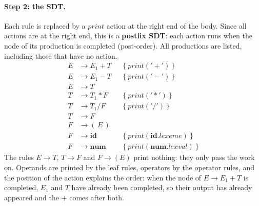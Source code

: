 \documentclass[11pt,a4paper]{article}
\newcommand{\at}[2]{\ensuremath{#1.\mathit{#2}}}
\newcommand{\tok}[1]{\ensuremath{\mathtt{#1}}}
\begin{document}
\paragraph{Step 2: the SDT.} Each rule is replaced by a $\mathit{print}$ action at the right end of the body. Since all actions are at the right end, this is a \textbf{postfix SDT}: each action runs when the node of its production is completed (post-order). All productions are listed, including those that have no action.
\begin{align*}
E &\to E_1 + T &&\{\ \mathit{print}(\tok{'+'})\ \}\\
E &\to E_1 - T &&\{\ \mathit{print}(\tok{'-'})\ \}\\
E &\to T\\
T &\to T_1 * F &&\{\ \mathit{print}(\tok{'*'})\ \}\\
T &\to T_1 / F &&\{\ \mathit{print}(\tok{'/'})\ \}\\
T &\to F\\
F &\to (\,E\,)\\
F &\to \mathbf{id}  &&\{\ \mathit{print}(\at{\mathbf{id}}{lexeme})\ \}\\
F &\to \mathbf{num} &&\{\ \mathit{print}(\at{\mathbf{num}}{lexval})\ \}
\end{align*}
The rules $E\to T$, $T\to F$ and $F\to(E)$ print nothing: they only pass the work on. Operands are printed by the leaf rules, operators by the operator rules, and the position of the action explains the order: when the node of $E\to E_1+T$ is completed, $E_1$ and $T$ have already been completed, so their output has already appeared and the $+$ comes after both.
\end{document}
